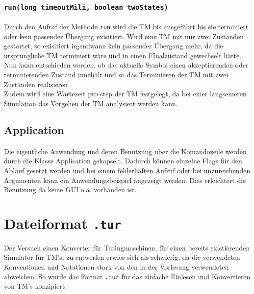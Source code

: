 \documentclass[10pt, a4paper]{article}
\newcommand{\ilc}{\texttt}
\begin{document}
\subsubsection*{\ilc{run(long timeoutMili, boolean twoStates)}}
\paragraph*{}
Durch den Aufruf der Methode \ilc{run} wird die TM bis ausgeführt bis sie terminiert oder kein passender Übergang exisitiert. Wird eine TM mit nur zwei Zuständen gestartet, so exisitiert irgendwann kein passender Übergang mehr, da die ursprüngliche TM terminiert wäre und in einen FInalzustand gewechselt hätte. Nun kann entschieden werden, ob das aktuelle Symbol einen akzeptierenden oder terminierenden Zustand innehält und so das Terminieren der TM mit zwei Zuständen realisieren.\\
Zudem wird eine Wartezeit pro step der TM festgelegt, da bei einer langsemeren Simulation das Vorgehen der TM analysiert werden kann.\par

\subsection*{Application}
\paragraph*{}
Die eigentliche Anwendung und deren Benutzung über die Komandozeile werden durch die Klasse Application gekapselt. Dadurch können einzelne Flags für den Ablauf gesetzt werden und bei einem fehlerhaften Aufruf oder bei unzureichenden Argumenten kann ein Anwendungsbeispiel angezeigt werden. Dies erleichtert die Benutzung da keine GUI o.ä. vorhanden ist.

\section*{Dateiformat \ilc{.tur}}
\paragraph*{}
Der Versuch einen Konverter für Turingmaschinen, für einen bereits existierenden Simulator für TM's, zu entwerfen erwies sich als schwierig, da die verwendeten Konventionen und Notationen stark von den in der Vorlesung verwendeten abweichen. So wurde das Format \ilc{.tur} für das einfache Einlesen und Konvertieren von TM's konzipiert.\par
\end{document}
